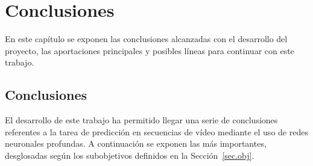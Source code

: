 \chapter{Conclusiones}\label{cap.conclusiones}
En este capítulo se exponen las conclusiones alcanzadas con el desarrollo del proyecto, las aportaciones principales y posibles líneas para continuar con este trabajo.

\section{Conclusiones}
El desarrollo de este trabajo ha permitido llegar una serie de conclusiones referentes a la tarea de predicción en secuencias de vídeo mediante el uso de redes neuronales profundas. A continuación se exponen las más importantes, desglosadas según los subobjetivos definidos en la Sección~\ref{sec.obj}.

